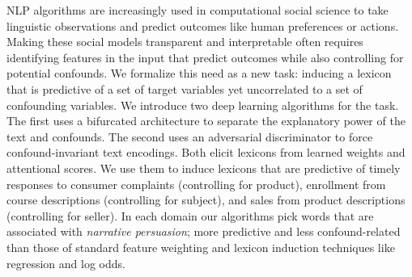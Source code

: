 NLP algorithms are increasingly used in computational social science to take linguistic observations and predict outcomes like human preferences or actions. Making these social models transparent and interpretable often requires identifying features in the input that predict outcomes while also controlling for potential confounds. We formalize this need as a new task: inducing a lexicon that is predictive of a set of target variables yet uncorrelated to a set of confounding variables. We introduce two deep learning algorithms for the task. The first uses a bifurcated architecture to separate the explanatory power of the text and confounds.  The second uses an adversarial discriminator to force confound-invariant text encodings. Both elicit lexicons from learned weights and attentional scores. We use them to induce lexicons that are predictive of timely responses to consumer complaints (controlling for product), enrollment from course descriptions (controlling for subject), and sales from product descriptions (controlling for seller). In each domain our algorithms pick words that are associated with \emph{narrative persuasion}; more predictive and less confound-related than those of standard feature weighting and lexicon induction techniques like regression and log odds.
